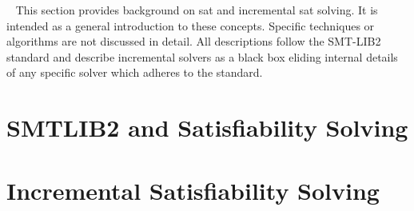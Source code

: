 ~\label{chapter:background}
%
This section provides background on \ac{sat} and incremental \ac{sat} solving.
It is intended as a general introduction to these concepts. Specific techniques
or algorithms are not discussed in detail. All descriptions follow the
SMT-LIB2~\cite{BarFT-SMTLIB} standard and describe incremental solvers as a
black box eliding internal details of any specific solver which adheres to the
standard.

\section{SMTLIB2 and Satisfiability Solving}


\section{Incremental Satisfiability Solving}


